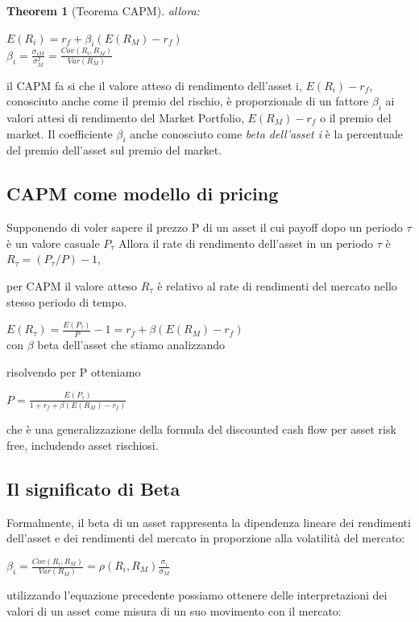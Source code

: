 \documentclass[a4paper,11pt]{report}
\newtheorem{theorem}{Theorem}
\begin{document}
{\begin{theorem}[Teorema CAPM]
	allora:
\begin{center}
	$E(R_i)=r_f+\beta_i (E(R_M)-r_f)$ \\
	$ \beta_i= {\frac {\sigma_{iM}}{\sigma_M^2}} = {\frac {Cov(R_i,R_M)}{Var(R_M)}} $
\end{center}
\end{theorem}
	il CAPM fa si che il valore atteso di rendimento dell'asset i, $E(R_i)-r_f$, conosciuto anche come il premio del rischio, è proporzionale  \newline
	di un fattore $\beta_i$ ai valori attesi di rendimento del Market Portfolio, $E(R_M)-r_f$ o il premio del market. \newline
	Il coefficiente $\beta_i$ anche conosciuto come \emph{beta dell'asset i} è la percentuale del premio dell'asset sul premio del market.
\subsection{CAPM come modello di pricing}
	Supponendo di voler sapere il prezzo P di un asset il cui payoff dopo un periodo $\tau$ è un valore casuale $P_\tau$ \newline
	Allora il rate di rendimento dell'asset in un periodo $\tau$ è $R_\tau = (P_\tau /P) - 1$,
	
	per CAPM il valore atteso $R_\tau$ è relativo al rate di rendimenti del mercato nello stesso periodo di tempo.
\begin{center}
	$E(R_\tau)={\frac {E(P_\tau)}{P}}-1 = r_f + \beta(E(R_M)-r_f) $ \\
	con $\beta$ beta dell'asset che stiamo analizzando
\end{center}
	risolvendo per P otteniamo
\begin{center}
	$P= {\frac {E(P_\tau)}{1+r_f+\beta(E(R_M)-r_f)}} $
\end{center}
 	che è una generalizzazione della formula del discounted cash flow per asset risk free, includendo asset rischiosi.
\subsection{Il significato di Beta}
	Formalmente, il beta di un asset rappresenta la dipendenza lineare dei rendimenti dell'asset e dei rendimenti del mercato in proporzione alla volatilità del mercato:
\begin{center}
	\Large{$ \beta_i = {\frac {Cov(R_i,R_M)}{Var(R_M)}} = \rho(R_i,R_M){\frac {\sigma_i}{\sigma_M}}$}
\end{center}
	utilizzando l'equazione precedente possiamo ottenere delle interpretazioni dei valori di un asset come misura di un suo movimento con il mercato:

}
\end{document}
